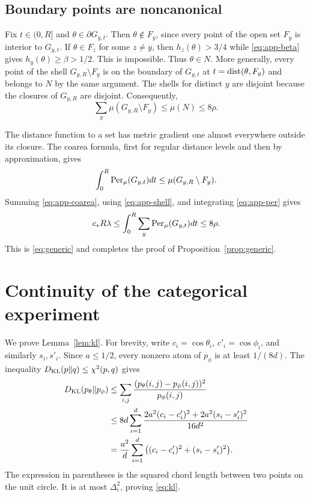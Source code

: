\subsection{Boundary points are noncanonical}

Fix $t\in(0,R]$ and $\theta\in\partial G_{y,t}$.
Then $\theta\notin F_y$, since every point of the open set $F_y$ is interior to $G_{y,t}$.
If $\theta\in F_z$ for some $z\ne y$, then $h_z(\theta)>3/4$ while \eqref{eq:app-beta} gives $h_y(\theta)\ge\beta>1/2$.
This is impossible.
Thus $\theta\in N$.
More generally, every point of the shell $G_{y,R}\setminus F_y$ is on the boundary of $G_{y,t}$ at
$t=\operatorname{dist}(\theta,F_y)$ and belongs to $N$ by the same argument.
The shells for distinct $y$ are disjoint because the closures of $G_{y,R}$ are disjoint.
Consequently,
\begin{equation}
 \sum_y\mu(G_{y,R}\setminus F_y)\le\mu(N)\le8\rho.
 \label{eq:app-shell}
\end{equation}

The distance function to a set has metric gradient one almost everywhere outside its closure.
The coarea formula, first for regular distance levels and then by approximation, gives
\begin{equation}
 \int_0^R\operatorname{Per}_\mu(G_{y,t})dt
 \le\mu(G_{y,R}\setminus F_y).
 \label{eq:app-coarea}
\end{equation}
Summing \eqref{eq:app-coarea}, using \eqref{eq:app-shell}, and integrating \eqref{eq:app-per} gives
\[
 c_*R\lambda
 \le\int_0^R\sum_y\operatorname{Per}_\mu(G_{y,t})dt
 \le8\rho.
\]
This is \eqref{eq:generic} and completes the proof of Proposition~\ref{prop:generic}.

\section{Continuity of the categorical experiment}
\label{app:kl}

We prove Lemma~\ref{lem:kl}.
For brevity, write $c_i=\cos\theta_i$, $c'_i=\cos\phi_i$, and similarly $s_i,s'_i$.
Since $a\le1/2$, every nonzero atom of $p_\phi$ is at least $1/(8d)$.
The inequality $D_{\mathrm{KL}}(p\Vert q)\le\chi^2(p,q)$ gives
\begin{align*}
 D_{\mathrm{KL}}(p_\theta\Vert p_\phi)
 &\le \sum_{i,j}
 \frac{(p_\theta(i,j)-p_\phi(i,j))^2}{p_\phi(i,j)}\\
 &\le 8d\sum_{i=1}^d
 \frac{2a^2(c_i-c'_i)^2+2a^2(s_i-s'_i)^2}{16d^2}\\
 &=\frac{a^2}{d}\sum_{i=1}^d
 \big((c_i-c'_i)^2+(s_i-s'_i)^2\big).
\end{align*}
The expression in parentheses is the squared chord length between two points on the unit circle.
It is at most $\Delta_i^2$, proving \eqref{eq:kl}.

